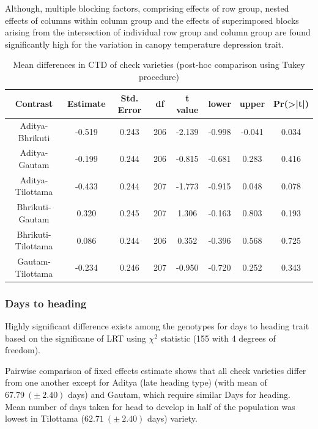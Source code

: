 \documentclass[12pt,oneside]{dukestatscithesis} %
\begin{document}
Although, multiple blocking factors, comprising effects of row group, nested effects of columns within column group and the effects of superimposed blocks arising from the intersection of individual row group and column group are found significantly high for the variation in canopy temperature depression trait.
\begin{table}[H]

\caption{\label{tab:other-meanconf-tab5}Mean differences in CTD of check varieties (post-hoc comparison using Tukey procedure)}
\centering
\begin{tabular}[t]{cccccccc}
\toprule
Contrast & Estimate & Std. Error & df & t value & lower & upper & Pr(>|t|)\\
\midrule
Aditya-Bhrikuti & -0.519 & 0.243 & 206 & -2.139 & -0.998 & -0.041 & 0.034\\
Aditya-Gautam & -0.199 & 0.244 & 206 & -0.815 & -0.681 & 0.283 & 0.416\\
Aditya-Tilottama & -0.433 & 0.244 & 207 & -1.773 & -0.915 & 0.048 & 0.078\\
Bhrikuti-Gautam & 0.320 & 0.245 & 207 & 1.306 & -0.163 & 0.803 & 0.193\\
Bhrikuti-Tilottama & 0.086 & 0.244 & 206 & 0.352 & -0.396 & 0.568 & 0.725\\
Gautam-Tilottama & -0.234 & 0.246 & 207 & -0.950 & -0.720 & 0.252 & 0.343\\
\bottomrule
\end{tabular}
\end{table}
\hypertarget{days-to-heading}{%
\subsubsection{Days to heading}\label{days-to-heading}}

Highly significant difference exists among the genotypes for days to heading trait based on the significane of LRT using \(\chi^2\) statistic (155 with 4 degrees of freedom).

Pairwise comparison of fixed effects estimate shows that all check varieties differ from one another except for Aditya (late heading type) (with mean of \(67.79\ (\pm\ 2.40)\) days) and Gautam, which require similar Days for heading. Mean number of days taken for head to develop in half of the population was lowest in Tilottama (\(62.71\ (\pm\ 2.40)\) days) variety.
\end{document}
